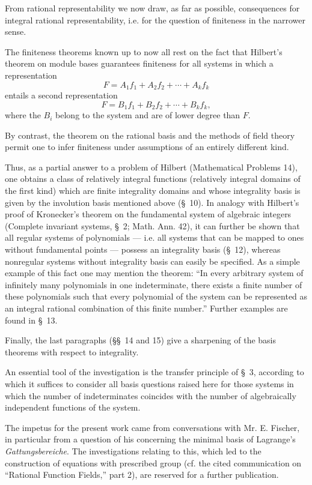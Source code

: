 \documentclass[11pt]{article}
\begin{document}
From rational representability we now draw, as far as possible, consequences for integral rational representability, i.e. for the question of finiteness in the narrower sense.

The finiteness theorems known up to now all rest on the fact that Hilbert's theorem on module bases guarantees finiteness for all systems in which a representation
\[
  F=A_1f_1+A_2f_2+\cdots+A_kf_k
\]
entails a second representation
\[
  F=B_1f_1+B_2f_2+\cdots+B_kf_k,
\]
where the $B_i$ belong to the system and are of lower degree than $F$.

By contrast, the theorem on the rational basis and the methods of field theory permit one to infer finiteness under assumptions of an entirely different kind.

Thus, as a partial answer to a problem of Hilbert (Mathematical Problems 14), one obtains a class of relatively integral functions (relatively integral domains of the first kind) which are finite integrality domains and whose integrality basis is given by the involution basis mentioned above (\S\ 10). In analogy with Hilbert's proof of Kronecker's theorem on the fundamental system of algebraic integers (Complete invariant systems, \S\ 2; Math. Ann. 42), it can further be shown that all regular systems of polynomials --- i.e. all systems that can be mapped to ones without fundamental points --- possess an integrality basis (\S\ 12), whereas nonregular systems without integrality basis can easily be specified. As a simple example of this fact one may mention the theorem: ``In every arbitrary system of infinitely many polynomials in one indeterminate, there exists a finite number of these polynomials such that every polynomial of the system can be represented as an integral rational combination of this finite number.'' Further examples are found in \S\ 13.

Finally, the last paragraphs (\S\S\ 14 and 15) give a sharpening of the basis theorems with respect to integrality.

An essential tool of the investigation is the transfer principle of \S\ 3, according to which it suffices to consider all basis questions raised here for those systems in which the number of indeterminates coincides with the number of algebraically independent functions of the system.

The impetus for the present work came from conversations with Mr. E. Fischer, in particular from a question of his concerning the minimal basis of Lagrange's \emph{Gattungsbereiche}. The investigations relating to this, which led to the construction of equations with prescribed group (cf. the cited communication on ``Rational Function Fields,'' part 2), are reserved for a further publication.
\end{document}
